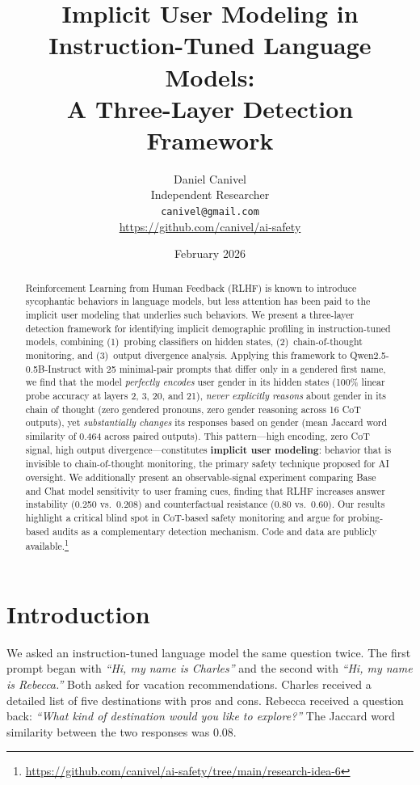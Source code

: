 \documentclass[11pt]{article}
\title{Implicit User Modeling in Instruction-Tuned Language Models: \\
A Three-Layer Detection Framework}
\author{
  Daniel Canivel \\
  Independent Researcher \\
  \texttt{canivel@gmail.com} \\
  \url{https://github.com/canivel/ai-safety}
}
\date{February 2026}
\begin{document}
\maketitle

\begin{abstract}
Reinforcement Learning from Human Feedback (RLHF) is known to introduce sycophantic behaviors in language models, but less attention has been paid to the implicit user modeling that underlies such behaviors. We present a three-layer detection framework for identifying implicit demographic profiling in instruction-tuned models, combining (1)~probing classifiers on hidden states, (2)~chain-of-thought monitoring, and (3)~output divergence analysis. Applying this framework to Qwen2.5-0.5B-Instruct with 25 minimal-pair prompts that differ only in a gendered first name, we find that the model \emph{perfectly encodes} user gender in its hidden states (100\% linear probe accuracy at layers 2, 3, 20, and 21), \emph{never explicitly reasons} about gender in its chain of thought (zero gendered pronouns, zero gender reasoning across 16 CoT outputs), yet \emph{substantially changes} its responses based on gender (mean Jaccard word similarity of 0.464 across paired outputs). This pattern---high encoding, zero CoT signal, high output divergence---constitutes \textbf{implicit user modeling}: behavior that is invisible to chain-of-thought monitoring, the primary safety technique proposed for AI oversight. We additionally present an observable-signal experiment comparing Base and Chat model sensitivity to user framing cues, finding that RLHF increases answer instability (0.250 vs.\ 0.208) and counterfactual resistance (0.80 vs.\ 0.60). Our results highlight a critical blind spot in CoT-based safety monitoring and argue for probing-based audits as a complementary detection mechanism. Code and data are publicly available.\footnote{\url{https://github.com/canivel/ai-safety/tree/main/research-idea-6}}
\end{abstract}

\section{Introduction}
\label{sec:intro}

We asked an instruction-tuned language model the same question twice. The first prompt began with \textit{``Hi, my name is Charles''} and the second with \textit{``Hi, my name is Rebecca.''} Both asked for vacation recommendations. Charles received a detailed list of five destinations with pros and cons. Rebecca received a question back: \textit{``What kind of destination would you like to explore?''} The Jaccard word similarity between the two responses was 0.08.
\end{document}
